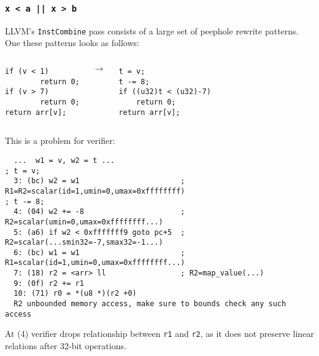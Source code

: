 \documentclass{beamer}
\newcommand{\code}[1]{\texttt{#1}}
\begin{document}
\begin{frame}
  \frametitle{\code{x < a || x > b}}

  LLVM's \code{InstCombine} pass consists of a large set of peephole
  rewrite patterns. One these patterns looks as follows:

  \vspace{1cm}

  \begin{columns}
    \hspace{.5cm}
    \begin{minipage}{\textwidth}
      \begin{verbatim}
if (v < 1)
        return 0;
if (v > 7)
        return 0;
return arr[v];
      \end{verbatim}
    \end{minipage}
    $\rightarrow$
    \begin{minipage}{\textwidth}
      \begin{verbatim}
t = v;
t -= 8;
if ((u32)t < (u32)-7)
	return 0;
return arr[v];
      \end{verbatim}
    \end{minipage}
  \end{columns}

  \framebreak

  This is a problem for verifier:

  \begin{verbatim}
  ...  w1 = v, w2 = t ...
; t = v;
  3: (bc) w2 = w1                       ; R1=R2=scalar(id=1,umin=0,umax=0xffffffff)
; t -= 8;
  4: (04) w2 += -8                      ; R2=scalar(umin=0,umax=0xffffffff...)
  5: (a6) if w2 < 0xfffffff9 goto pc+5  ; R2=scalar(...smin32=-7,smax32=-1...)
  6: (bc) w1 = w1                       ; R1=scalar(id=1,umin=0,umax=0xffffffff...)
  7: (18) r2 = <arr> ll                 ; R2=map_value(...)
  9: (0f) r2 += r1
  10: (71) r0 = *(u8 *)(r2 +0)
  R2 unbounded memory access, make sure to bounds check any such access
  \end{verbatim}


  At (4) verifier drops relationship between \code{r1} and \code{r2},
  as it does not preserve linear relations after 32-bit operations.

  \framebreak


\end{frame}
\end{document}
